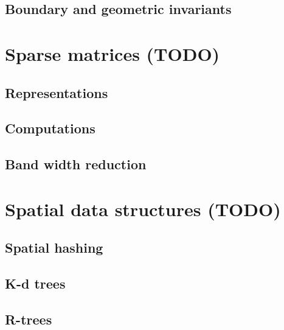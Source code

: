 \documentclass[12pt]{article}
\theoremstyle{plain}
\theoremstyle{remark}
\begin{document}
\subsection{Boundary and geometric invariants}

\pagebreak
\section{Sparse matrices (TODO)}
\subsection{Representations}
\subsection{Computations}
\subsection{Band width reduction}

\pagebreak
\section{Spatial data structures (TODO)}

\subsection{Spatial hashing}

\subsection{K-d trees}

\subsection{R-trees}
\end{document}
